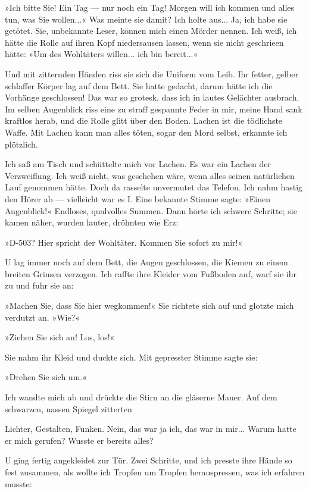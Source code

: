 »Ich bitte Sie! Ein Tag — nur noch ein Tag! Morgen will ich kommen
und alles tun, was Sie wollen...« Was meinte sie damit? Ich holte
aus... Ja, ich habe sie getötet. Sie, unbekannte Leser, können mich
einen Mörder nennen. Ich weiß, ich hätte die Rolle auf ihren Kopf
niedersausen lassen, wenn sie nicht geschrieen hätte: »Um des
Wohltäters willen... ich bin bereit...«

Und mit zitternden Händen riss sie sich die Uniform vom Leib. Ihr
fetter, gelber schlaffer Körper lag auf dem Bett. Sie hatte
gedacht, darum hätte ich die Vorhänge geschlossen! Das war so
grotesk, dass ich in lautes Gelächter ausbrach. Im selben
Augenblick riss eine zu straff gespannte Feder in mir, meine Hand
sank kraftlos herab, und die Rolle glitt über den Boden. Lachen ist
die tödlichste Waffe. Mit Lachen kann man alles töten, sogar den
Mord selbst, erkannte ich plötzlich.

Ich saß am Tisch und schüttelte mich vor Lachen. Es war ein Lachen
der Verzweiflung. Ich weiß nicht, was geschehen wäre, wenn alles
seinen natürlichen Lauf genommen hätte. Doch da rasselte unvermutet
das Telefon. Ich nahm hastig den Hörer ab — vielleicht war es I.
Eine bekannte Stimme sagte: »Einen Augenblick!« Endloses,
qualvolles Summen. Dann hörte ich schwere Schritte; sie kamen
näher, wurden lauter, dröhnten wie Erz:

»D-503? Hier spricht der Wohltäter. Kommen Sie sofort zu mir!«

U lag immer noch auf dem Bett, die Augen geschlossen, die Kiemen zu
einem breiten Grinsen verzogen. Ich raffte ihre Kleider vom
Fußboden auf, warf sie ihr zu und fuhr sie an:

»Machen Sie, dass Sie hier wegkommen!« Sie richtete sich auf und
glotzte mich verdutzt an. »Wie?«

»Ziehen Sie sich an! Los, los!«

Sie nahm ihr Kleid und duckte sich. Mit gepresster Stimme sagte
sie:

»Drehen Sie sich um.«

Ich wandte mich ab und drückte die Stirn an die gläserne Mauer. Auf
dem schwarzen, nassen Spiegel zitterten

Lichter, Gestalten, Funken. Nein, das war ja ich, das war in mir...
Warum hatte er mich gerufen? Wusste er bereits alles?

U ging fertig angekleidet zur Tür. Zwei Schritte, und ich presste
ihre Hände so fest zusammen, als wollte ich Tropfen um Tropfen
herauspressen, was ich erfahren musste:


